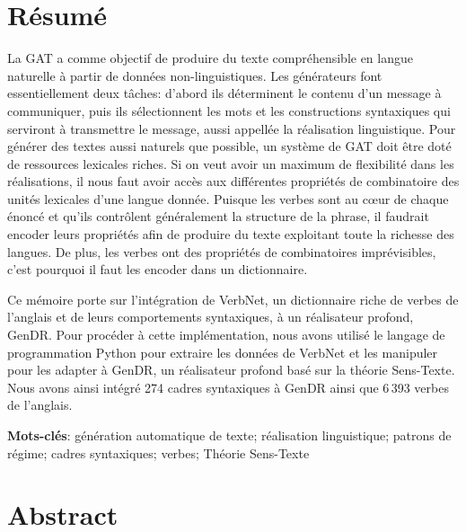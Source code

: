 \chapter*{Résumé} 	%
La \ac{GAT} a comme objectif de produire du texte compréhensible en langue naturelle à partir de données non-linguistiques. Les générateurs font essentiellement deux tâches: d'abord ils déterminent le contenu d'un message à communiquer, puis ils sélectionnent les mots et les constructions syntaxiques qui serviront à transmettre le message, aussi appellée la réalisation linguistique. Pour générer des textes aussi naturels que possible, un système de \ac{GAT} doit être doté de ressources lexicales riches. Si on veut avoir un maximum de flexibilité dans les réalisations, il nous faut avoir accès aux différentes propriétés de combinatoire des unités lexicales d'une langue donnée. Puisque les verbes sont au c\oe{}ur de chaque énoncé et qu'ils contrôlent généralement la structure de la phrase, il faudrait encoder leurs propriétés afin de produire du texte exploitant toute la richesse des langues. De plus, les verbes ont des propriétés de combinatoires imprévisibles, c'est pourquoi il faut les encoder dans un dictionnaire.

Ce mémoire porte sur l'intégration de VerbNet, un dictionnaire riche de verbes de l'anglais et de leurs comportements syntaxiques, à un réalisateur profond, GenDR. Pour procéder à cette implémentation, nous avons utilisé le langage de programmation Python pour extraire les données de VerbNet et les manipuler pour les adapter à GenDR, un réalisateur profond basé sur la théorie Sens-Texte. Nous avons ainsi intégré 274 cadres syntaxiques à GenDR ainsi que 6\,393 verbes de l'anglais.

\textbf{Mots-clés}: génération automatique de texte; réalisation linguistique; patrons de régime; cadres syntaxiques; verbes; Théorie Sens-Texte

\chapter*{Abstract}

